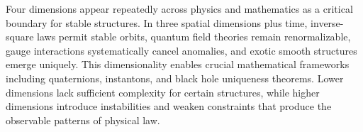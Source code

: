 Four dimensions appear repeatedly across physics and mathematics as a critical boundary for stable structures. In three spatial dimensions plus time, inverse-square laws permit stable orbits, quantum field theories remain renormalizable, gauge interactions systematically cancel anomalies, and exotic smooth structures emerge uniquely. This dimensionality enables crucial mathematical frameworks including quaternions, instantons, and black hole uniqueness theorems. Lower dimensions lack sufficient complexity for certain structures, while higher dimensions introduce instabilities and weaken constraints that produce the observable patterns of physical law.
